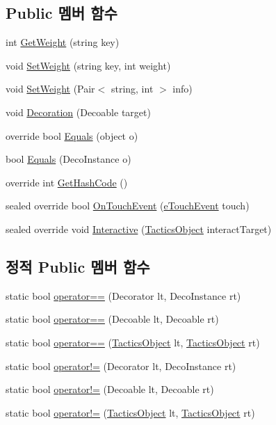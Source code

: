 \subsection*{Public 멤버 함수}
\begin{DoxyCompactItemize}
\item 
int \hyperlink{class_m_c_n_1_1_decorator_a2fa8df5e51cc3fdaa63b28c4e4917670}{Get\+Weight} (string key)
\item 
void \hyperlink{class_m_c_n_1_1_decorator_a0658f2776c28dad0517b56085910162c}{Set\+Weight} (string key, int weight)
\item 
void \hyperlink{class_m_c_n_1_1_decorator_aa64c6b8a8f30f4e8083da6dd0fab226c}{Set\+Weight} (Pair$<$ string, int $>$ info)
\item 
void \hyperlink{class_m_c_n_1_1_decorator_ab82c83f62182a25a72dc81530c743c32}{Decoration} (Decoable target)
\item 
override bool \hyperlink{class_m_c_n_1_1_decorator_ae2a5432ce00298c80dcb433a75bbe45d}{Equals} (object o)
\item 
bool \hyperlink{class_m_c_n_1_1_decorator_a3ad7a8cf76c976907116f85a65a9f8e9}{Equals} (Deco\+Instance o)
\item 
override int \hyperlink{class_m_c_n_1_1_decorator_a6df84cd2af5b096128e84791455c083f}{Get\+Hash\+Code} ()
\item 
sealed override bool \hyperlink{class_m_c_n_1_1_decorator_ac45ab12c190bd9f5188c9f748f8ddbbf}{On\+Touch\+Event} (\hyperlink{_touch_manager_8cs_ae33e321a424fe84ba8b2fdb81ad40a68}{e\+Touch\+Event} touch)
\item 
sealed override void \hyperlink{class_m_c_n_1_1_decorator_ae58cb79cf1ee47006b7dbdac82b97dc5}{Interactive} (\hyperlink{class_tactics_object}{Tactics\+Object} interact\+Target)
\end{DoxyCompactItemize}
\subsection*{정적 Public 멤버 함수}
\begin{DoxyCompactItemize}
\item 
static bool \hyperlink{class_m_c_n_1_1_decorator_a4c4c97e4a4dcf1a66e764740a5bbf3c6}{operator==} (Decorator lt, Deco\+Instance rt)
\item 
static bool \hyperlink{class_m_c_n_1_1_decoable_a6004bbc5f208c3031388c9d6e8f8359b}{operator==} (Decoable lt, Decoable rt)
\item 
static bool \hyperlink{class_tactics_object_a18f2979a4bf81dc755fbc17e425809f0}{operator==} (\hyperlink{class_tactics_object}{Tactics\+Object} lt, \hyperlink{class_tactics_object}{Tactics\+Object} rt)
\item 
static bool \hyperlink{class_m_c_n_1_1_decorator_a89e2f61a0974c51610a0c8d14ef6962a}{operator!=} (Decorator lt, Deco\+Instance rt)
\item 
static bool \hyperlink{class_m_c_n_1_1_decoable_aa75e4102ebd7265f577028b407534d27}{operator!=} (Decoable lt, Decoable rt)
\item 
static bool \hyperlink{class_tactics_object_a49e235618a22126faa6271243cd89710}{operator!=} (\hyperlink{class_tactics_object}{Tactics\+Object} lt, \hyperlink{class_tactics_object}{Tactics\+Object} rt)
\end{DoxyCompactItemize}
